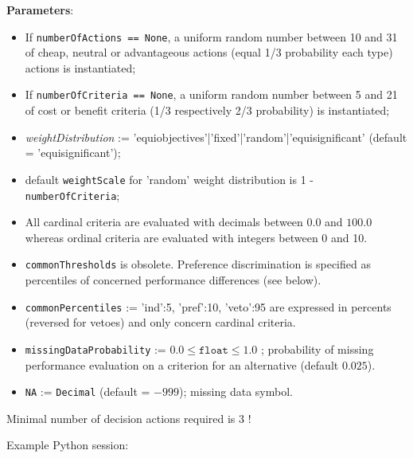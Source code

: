 \textbf{Parameters}:
\begin{itemize}
\item If \texttt{numberOfActions == None}, a uniform random number between 10 and 31 of cheap, neutral or advantageous actions (equal 1/3 probability each type) actions is instantiated;
\item If \texttt{numberOfCriteria == None}, a uniform random number between 5 and 21 of cost or benefit criteria (1/3 respectively 2/3 probability) is instantiated;
\item \emph{weightDistribution} := {'equiobjectives'|'fixed'|'random'|'equisignificant' (default = 'equisignificant')};
\item default \texttt{weightScale} for 'random' weight distribution is 1 - \texttt{numberOfCriteria};
\item All cardinal criteria are evaluated with decimals between $0.0$ and $100.0$ whereas ordinal criteria are evaluated with integers between 0 and 10.
\item \texttt{commonThresholds} is obsolete. Preference discrimination is specified as percentiles of concerned performance differences (see below).
\item \texttt{commonPercentiles} := {'ind':5, 'pref':10, 'veto':95} are expressed in percents (reversed for vetoes) and only concern cardinal criteria.
\item \texttt{missingDataProbability} := $0.0 \leq \mathtt{float} \leq 1.0$ ; probability of missing performance evaluation on a criterion for an alternative (default $0.025$).
\item \texttt{NA} := \texttt{Decimal} (default = $-999$); missing data symbol. 
\end{itemize}

\begin{svgraybox}Minimal number of decision actions required is 3 ! 
\end{svgraybox}

Example Python session:

